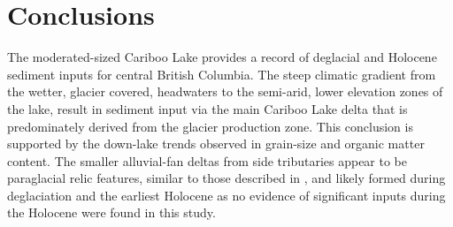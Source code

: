 \documentclass[Royal,times,doublespace,sageh]{sagej}
\begin{document}
\hypertarget{conclusions}{%
\section{Conclusions}\label{conclusions}}

The moderated-sized Cariboo Lake provides a record of deglacial and
Holocene sediment inputs for central British Columbia. The steep
climatic gradient from the wetter, glacier covered, headwaters to the
semi-arid, lower elevation zones of the lake, result in sediment input
via the main Cariboo Lake delta that is predominately derived from the
glacier production zone. This conclusion is supported by the down-lake
trends observed in grain-size and organic matter content. The smaller
alluvial-fan deltas from side tributaries appear to be paraglacial relic
features, similar to those described in \citet{Church1972}, and likely
formed during deglaciation and the earliest Holocene as no evidence of
significant inputs during the Holocene were found in this study.
\end{document}
